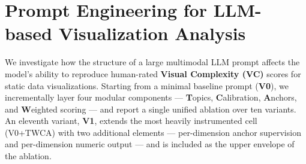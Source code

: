 %

\appendix
\section{Prompt Engineering for LLM-based Visualization Analysis}
\label{app:vc-prompts}

We investigate how the structure of a large multimodal LLM prompt affects
the model's ability to reproduce human-rated \textbf{Visual Complexity (VC)}
scores for static data visualizations. Starting from a minimal baseline
prompt (\textbf{V0}), we incrementally layer four modular components ---
\textbf{T}opics, \textbf{C}alibration, \textbf{A}nchors, and
\textbf{W}eighted scoring --- and report a single unified ablation over ten
variants. An eleventh variant, \textbf{V1}, extends the most heavily
instrumented cell (V0+TWCA) with two additional elements --- per-dimension
anchor supervision and per-dimension numeric output --- and is included as
the upper envelope of the ablation.

